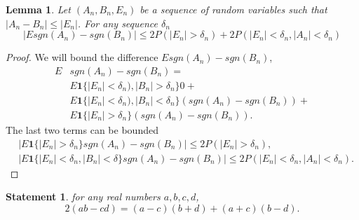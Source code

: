 \documentclass{article}
\newtheorem{definition}{Definition}
\newtheorem{lemma}{Lemma}
\newtheorem{statement}{Statement}
\begin{document}
\begin{lemma}
\label{lem:bnd}
Let $(A_n,B_n,E_n)$ be a sequence of random variables such that  $|A_n-B_n| \leq |E_n|$. For any sequence $\delta_n$
\[
\left | E  sgn(A_n) - sgn(B_n) \right | \leq  2P(|E_n|>\delta_n) + 2 P(|E_n| < \delta_n ,|A_n| < \delta_n)
\]
\end{lemma} 
\begin{proof}
We will bound the difference $E sgn(A_n) - sgn(B_n)$,
\begin{align}
E&  sgn(A_n) - sgn(B_n)= \\
&E \mathbf  1 \{ |E_n| < \delta_n ) , |B_n| > \delta_n \} 0 +\\
&E \mathbf 1 \{ |E_n| < \delta_n)  , |B_n| < \delta_n\}  (sgn(A_n) - sgn(B_n)) + \\
&E \mathbf 1 \{ |E_n| > \delta_n  \}  (sgn(A_n) - sgn(B_n)).  
 \end{align}
The last two terms can be bounded
 \begin{align}
&   |E\mathbf 1 \{ |E_n| > \delta_n   \}  sgn(A_n) - sgn(B_n)| \leq 2 P( |E_n|>\delta_n) , \\
&   |E \mathbf 1 \{ |E_n| < \delta_n   , |B_n| < \delta  \}  sgn(A_n) - sgn(B_n) | \leq 2 P(|E_n| < \delta_n ,|A_n| < \delta_n) . 
\end{align}
\end{proof}




\begin{statement}
\label{lemma:keyLemma}
 for any real numbers $a,b,c,d$, 
 \[
  2(ab -cd) = (a-c)(b+d) + (a+c)(b-d). 
 \]
\end{statement}

\end{document}
